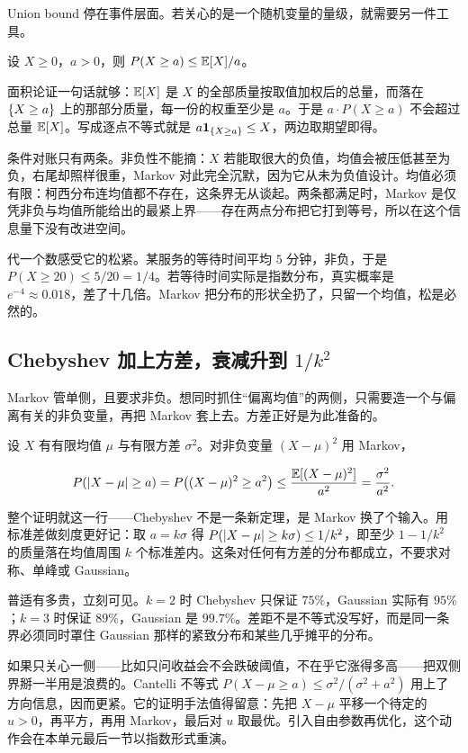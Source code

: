 Union bound 停在事件层面。若关心的是一个随机变量的量级，就需要另一件工具。

\begin{theorem}
设 \(X\ge0\)，\(a>0\)，则 \(P(X\ge a)\le\mathbb{E}[X]/a\)。
\end{theorem}

面积论证一句话就够：\(\mathbb{E}[X]\) 是 \(X\) 的全部质量按取值加权后的总量，而落在 \(\left\{X\ge a\right\}\) 上的那部分质量，每一份的权重至少是 \(a\)。于是 \(a\cdot P(X\ge a)\) 不会超过总量 \(\mathbb{E}[X]\)。写成逐点不等式就是 \(a\mathbf{1}_{\left\{X\ge a\right\}}\le X\)，两边取期望即得。

条件对账只有两条。非负性不能摘：\(X\) 若能取很大的负值，均值会被压低甚至为负，右尾却照样很重，Markov 对此完全沉默，因为它从未为负值设计。均值必须有限：柯西分布连均值都不存在，这条界无从谈起。两条都满足时，Markov 是仅凭非负与均值所能给出的最紧上界——存在两点分布把它打到等号，所以在这个信息量下没有改进空间。

代一个数感受它的松紧。某服务的等待时间平均 \(5\) 分钟，非负，于是 \(P(X\ge20)\le5/20=1/4\)。若等待时间实际是指数分布，真实概率是 \(e^{-4}\approx0.018\)，差了十几倍。Markov 把分布的形状全扔了，只留一个均值，松是必然的。

\subsection{Chebyshev 加上方差，衰减升到 \texorpdfstring{\(1/k^2\)}{1/k 平方}}

Markov 管单侧，且要求非负。想同时抓住``偏离均值''的两侧，只需要造一个与偏离有关的非负变量，再把 Markov 套上去。方差正好是为此准备的。

设 \(X\) 有有限均值 \(\mu\) 与有限方差 \(\sigma^2\)。对非负变量 \((X-\mu)^2\) 用 Markov，

\[
P(\left|X-\mu\right|\ge a)=P\bigl((X-\mu)^2\ge a^2\bigr)\le\frac{\mathbb{E}[(X-\mu)^2]}{a^2}=\frac{\sigma^2}{a^2}.
\]

整个证明就这一行——Chebyshev 不是一条新定理，是 Markov 换了个输入。用标准差做刻度更好记：取 \(a=k\sigma\) 得 \(P(\left|X-\mu\right|\ge k\sigma)\le1/k^2\)，即至少 \(1-1/k^2\) 的质量落在均值周围 \(k\) 个标准差内。这条对任何有方差的分布都成立，不要求对称、单峰或 Gaussian。

普适有多贵，立刻可见。\(k=2\) 时 Chebyshev 只保证 \(75\%\)，Gaussian 实际有 \(95\%\)；\(k=3\) 时保证 \(89\%\)，Gaussian 是 \(99.7\%\)。差距不是不等式没写好，而是同一条界必须同时罩住 Gaussian 那样的紧致分布和某些几乎摊平的分布。

如果只关心一侧——比如只问收益会不会跌破阈值，不在乎它涨得多高——把双侧界掰一半用是浪费的。Cantelli 不等式 \(P(X-\mu\ge a)\le\sigma^2/(\sigma^2+a^2)\) 用上了方向信息，因而更紧。它的证明手法值得留意：先把 \(X-\mu\) 平移一个待定的 \(u>0\)，再平方，再用 Markov，最后对 \(u\) 取最优。引入自由参数再优化，这个动作会在本单元最后一节以指数形式重演。

